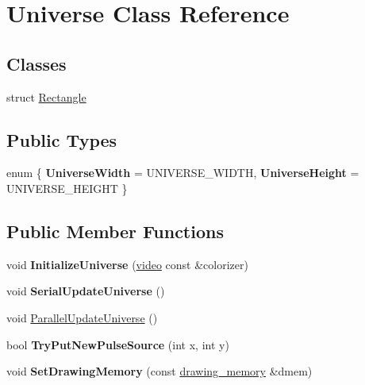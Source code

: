 \hypertarget{classUniverse}{}\section{Universe Class Reference}
\label{classUniverse}
\subsection*{Classes}
\begin{DoxyCompactItemize}
\item 
struct \hyperlink{structUniverse_1_1Rectangle}{Rectangle}
\end{DoxyCompactItemize}
\subsection*{Public Types}
\begin{DoxyCompactItemize}
\item 
\hypertarget{classUniverse_ab6253110c101b462748805a187f4ffd1}{}enum \{ {\bfseries Universe\+Width} = U\+N\+I\+V\+E\+R\+S\+E\+\_\+\+W\+I\+D\+T\+H, 
{\bfseries Universe\+Height} = U\+N\+I\+V\+E\+R\+S\+E\+\_\+\+H\+E\+I\+G\+H\+T
 \}\label{classUniverse_ab6253110c101b462748805a187f4ffd1}

\end{DoxyCompactItemize}
\subsection*{Public Member Functions}
\begin{DoxyCompactItemize}
\item 
\hypertarget{classUniverse_ad47133c93f665b13d56176497c3a455e}{}void {\bfseries Initialize\+Universe} (\hyperlink{classvideo}{video} const \&colorizer)\label{classUniverse_ad47133c93f665b13d56176497c3a455e}

\item 
\hypertarget{classUniverse_ad12f77cb4206cb2e7ff72990b988ff39}{}void {\bfseries Serial\+Update\+Universe} ()\label{classUniverse_ad12f77cb4206cb2e7ff72990b988ff39}

\item 
void \hyperlink{classUniverse_a9ce8ce73fd7f2695357914e6131ad670}{Parallel\+Update\+Universe} ()
\item 
\hypertarget{classUniverse_a87548452549f5eccd88ccd7acbd9b8ab}{}bool {\bfseries Try\+Put\+New\+Pulse\+Source} (int x, int y)\label{classUniverse_a87548452549f5eccd88ccd7acbd9b8ab}

\item 
\hypertarget{classUniverse_ac791f5a23f435244ecdd3733c3e38243}{}void {\bfseries Set\+Drawing\+Memory} (const \hyperlink{classdrawing__memory}{drawing\+\_\+memory} \&dmem)\label{classUniverse_ac791f5a23f435244ecdd3733c3e38243}

\end{DoxyCompactItemize}
